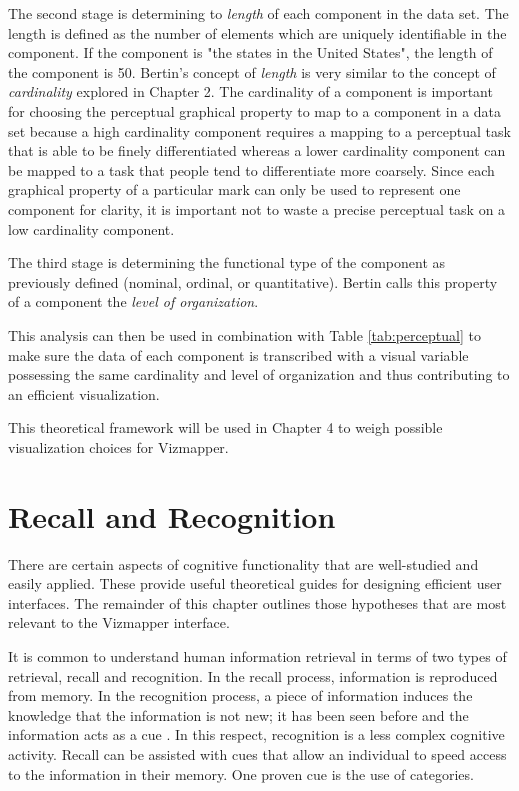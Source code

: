 The second stage is determining to \emph{length} of each component in the data set. The length is defined as the number of elements which are uniquely identifiable in the component. If the component is "the states in the United States", the length of the component is 50. Bertin's concept of \emph{length} is very similar to the concept of \emph{cardinality} explored in Chapter 2. The cardinality of a component is important for choosing the perceptual graphical property to map to a component in a data set because a high cardinality component requires a mapping to a perceptual task that is able to be finely differentiated whereas a lower cardinality component can be mapped to a task that people tend to differentiate more coarsely. Since each graphical property of a particular mark can only be used to represent one component for clarity, it is important not to waste a precise perceptual task on a low cardinality component.

The third stage is determining the functional type of the component as previously defined (nominal, ordinal, or quantitative). Bertin calls this property of a component the \emph{level of organization}.

This analysis can then be used in combination with Table \ref{tab:perceptual} to make sure the data of each component is transcribed with a visual variable possessing the same cardinality and level of organization and thus contributing to an efficient visualization.

This theoretical framework will be used in Chapter 4 to weigh possible visualization choices for Vizmapper.

\section{Recall and Recognition}

There are certain aspects of cognitive functionality that are well-studied and easily applied. These provide useful theoretical guides for designing efficient user interfaces. The remainder of this chapter outlines those hypotheses that are most relevant to the Vizmapper interface.

It is common to understand human information retrieval in terms of two types of retrieval, recall and recognition. In the recall process, information is reproduced from memory. In the recognition process, a piece of information induces the knowledge that the information is not new; it has been seen before and the information acts as a cue \cite{hci1998}. In this respect, recognition is a less complex cognitive activity. Recall can be assisted with cues that allow an individual to speed access to the information in their memory. One proven cue is the use of categories.

